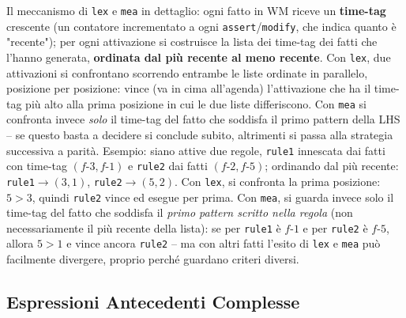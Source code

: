 \documentclass[a4paper,11pt]{article}
\begin{document}
Il meccanismo di \texttt{lex} e \texttt{mea} in dettaglio: ogni fatto in WM riceve un \textbf{time-tag} crescente (un contatore incrementato a ogni \texttt{assert}/\texttt{modify}, che indica quanto è "recente"); per ogni attivazione si costruisce la lista dei time-tag dei fatti che l'hanno generata, \textbf{ordinata dal più recente al meno recente}. Con \texttt{lex}, due attivazioni si confrontano scorrendo entrambe le liste ordinate in parallelo, posizione per posizione: vince (va in cima all'agenda) l'attivazione che ha il time-tag più alto alla prima posizione in cui le due liste differiscono. Con \texttt{mea} si confronta invece \emph{solo} il time-tag del fatto che soddisfa il primo pattern della LHS -- se questo basta a decidere si conclude subito, altrimenti si passa alla strategia successiva a parità. Esempio: siano attive due regole, \texttt{rule1} innescata dai fatti con time-tag $(f\text{-}3, f\text{-}1)$ e \texttt{rule2} dai fatti $(f\text{-}2, f\text{-}5)$; ordinando dal più recente: \texttt{rule1}$\to(3,1)$, \texttt{rule2}$\to(5,2)$. Con \texttt{lex}, si confronta la prima posizione: $5>3$, quindi \texttt{rule2} vince ed esegue per prima. Con \texttt{mea}, si guarda invece solo il time-tag del fatto che soddisfa il \emph{primo pattern scritto nella regola} (non necessariamente il più recente della lista): se per \texttt{rule1} è $f\text{-}1$ e per \texttt{rule2} è $f\text{-}5$, allora $5>1$ e vince ancora \texttt{rule2} -- ma con altri fatti l'esito di \texttt{lex} e \texttt{mea} può facilmente divergere, proprio perché guardano criteri diversi.

\subsection{Espressioni Antecedenti Complesse}
\end{document}
